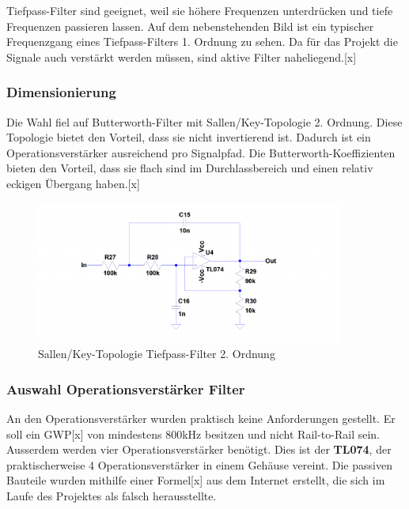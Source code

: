 Tiefpass-Filter sind geeignet, weil sie höhere Frequenzen unterdrücken und tiefe Frequenzen passieren lassen. Auf dem nebenstehenden Bild ist ein typischer Frequenzgang eines Tiefpass-Filters 1. Ordnung zu sehen. Da für das Projekt die Signale auch verstärkt werden müssen, sind aktive Filter naheliegend.[x]


\subsubsection*{Dimensionierung}

Die Wahl fiel auf Butterworth-Filter mit Sallen/Key-Topologie 2. Ordnung. Diese Topologie bietet den Vorteil, dass sie nicht invertierend ist. Dadurch ist ein Operationsverstärker ausreichend pro Signalpfad. Die Butterworth-Koeffizienten bieten den Vorteil, dass sie flach sind im Durchlassbereich und einen relativ eckigen Übergang haben.[x] 



\begin{figure}[H]
\begin{center}
\includegraphics[width=0.9\textwidth]{images/Analoge_Schaltung_Sallen.png}
\caption{Sallen/Key-Topologie Tiefpass-Filter 2. Ordnung}
\end{center}
\end{figure}


\subsubsection*{Auswahl Operationsverstärker Filter}
An den Operationsverstärker wurden praktisch keine Anforderungen gestellt. Er soll ein GWP[x] von mindestens 800kHz besitzen und nicht Rail-to-Rail sein. Ausserdem werden vier Operationsverstärker benötigt. Dies ist der \textbf{TL074}, der praktischerweise 4 Operationsverstärker in einem Gehäuse vereint. Die passiven Bauteile wurden mithilfe einer Formel[x] aus dem Internet erstellt, die sich im Laufe des Projektes als falsch herausstellte.

